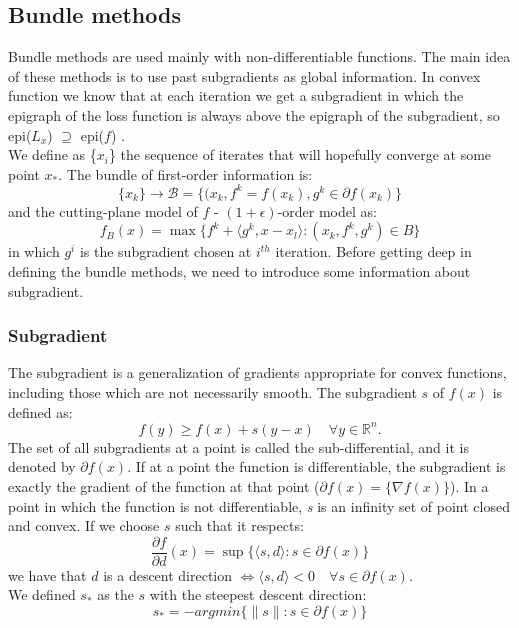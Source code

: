 \subsection{Bundle methods}
\label{Bundle-methods}
Bundle methods are used mainly with non-differentiable functions. The main idea of these methods is to use past subgradients as global information. In convex function we know that at each iteration we get a subgradient in which the epigraph of the loss function is always above the epigraph of the subgradient, so epi($L_x$) $ \supseteq $ epi($f$) .\\ 
We define as \{$x_i$\} the sequence of iterates that will hopefully converge at some point $x_*$. 
The bundle of first-order information is:
\begin{equation}
\{x_{k}\}\rightarrow \mathcal{B}=\{(x_{k}, f^k=f(x_{k}), g^{k} \in \partial f(x_{k})\}
\end{equation}
and the cutting-plane model of $f$ - $(1 +\epsilon)$-order model as:
\begin{equation}
\label{CP-model}
f_B(x) = \max{\{f^k+ \langle g^k,x - x_l \rangle:  (x_k,f^k,g^k)\in B\}}
\end{equation}
in which $g^i$ is the subgradient chosen at $i^{th}$ iteration.
Before getting deep in defining the bundle methods, we need to introduce some information about subgradient.
\subsubsection{Subgradient}
The subgradient is a generalization of gradients appropriate for convex functions, including those which are not necessarily smooth.
The subgradient $s$ of $f(x)$ is defined as:
\begin{equation}
f(y) \geq f(x) +s(y-x) \quad \forall y \in \mathbb{R}^n.
\end{equation}
The set of all subgradients at a point is called the sub-differential, and it is denoted by $\partial f(x)$. 
If at a point the function is differentiable, the subgradient is exactly the gradient of the function at that point ($\partial f(x)= \{\nabla f(x) \}$).
In a point in which the function is not differentiable, \textit{s} is an infinity set of point closed and convex.
If we choose $s$ such that it respects:
\begin{equation}
\frac{\partial f}{\partial d}(x)=\sup\{\langle s,d \rangle : s \in \partial f(x)\} 
\end{equation} 
we have that $d$ is a descent direction $\iff \langle s,d\rangle <0 \quad \forall s \in \partial f(x)$.
\\ We defined $s_*$ as the $s$ with the steepest descent direction:
\begin{equation}
s_*= -argmin\{\parallel s\parallel : s\in \partial f(x) \}
\end{equation} 
